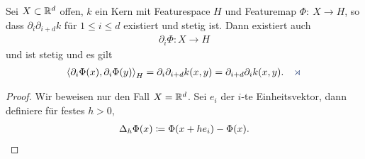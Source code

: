 \begin{lem}
\label{prop:5.3.9}
Sei $X\subset\mathbb{R}^d$ offen, $k$ ein Kern mit Featurespace $H$ und Featuremap
$\Phi:~X\to H$, so dass $\partial_i\partial_{i+d} k$ für
$1\le i\le d$ existiert und stetig ist. Dann existiert auch
\begin{align*}
\partial_i \Phi: X\to H
\end{align*}
und ist stetig und es gilt
\begin{align*}
\lin{\partial_i \Phi(x),\partial_i\Phi(y)}_H = 
\partial_i\partial_{i+d}k(x,y) =
\partial_{i+d}\partial_{i}k(x,y).\fishhere 
\end{align*}
\end{lem}
\begin{proof}
Wir beweisen nur den Fall $X=\mathbb{R}^d$. Sei $e_i$ der $i$-te Einheitsvektor, dann
definiere für festes $h>0$,
\begin{align*}
\Delta_h \Phi(x) \coloneq \Phi(x+he_i) - \Phi(x).
\end{align*}


\end{proof}
